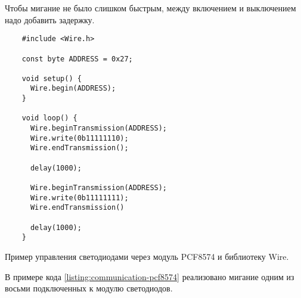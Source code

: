 \documentclass[../sparc.tex]{subfiles}
\begin{document}
Чтобы мигание не было слишком быстрым, между включением и выключением надо
добавить задержку.

\begin{listing}[H]
  \begin{verbatim}
    #include <Wire.h>

    const byte ADDRESS = 0x27;

    void setup() {
      Wire.begin(ADDRESS);
    }

    void loop() {
      Wire.beginTransmission(ADDRESS);
      Wire.write(0b11111110);
      Wire.endTransmission();

      delay(1000);

      Wire.beginTransmission(ADDRESS);
      Wire.write(0b11111111);
      Wire.endTransmission()

      delay(1000);
    }
  \end{verbatim}
  \label{listing:communication-pcf8574}
  \caption{Пример управления светодиодами через модуль PCF8574 и библиотеку
    Wire.}
\end{listing}

В примере кода \ref{listing:communication-pcf8574} реализовано мигание одним из
восьми подключенных к модулю светодиодов.
\end{document}
